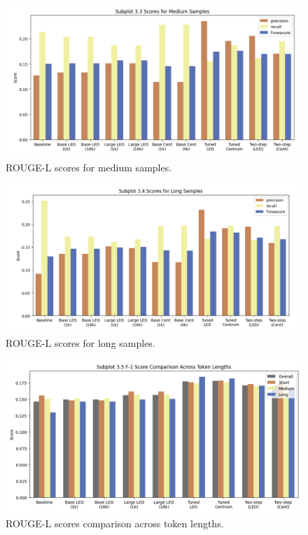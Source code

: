 \documentclass[12pt, twocolumn]{article}
\numberwithin{equation}{section}
\begin{document}
\begin{figure}
    \includegraphics[width=\textwidth]{medium.png}
    \caption{ROUGE-L scores for medium samples.}
    \label{fig:medium}
\end{figure}

\begin{figure}
    \includegraphics[width=\textwidth]{long.png}
    \caption{ROUGE-L scores for long samples.}
    \label{fig:long}
\end{figure}

\begin{figure}
    \includegraphics[width=\textwidth]{various_lengths.png}
    \caption{ROUGE-L scores comparison across token lengths.}
    \label{fig:various-length}
\end{figure}
\end{document}
